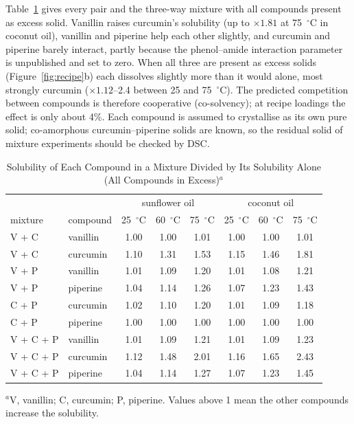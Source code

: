 \documentclass[journal=jceaax,manuscript=article,layout=twocolumn]{achemso}
\begin{document}
Table~\ref{tab:mix} gives every pair and the three-way mixture with all compounds present as excess solid. Vanillin raises curcumin's solubility (up to $\times1.81$ at 75~$^\circ$C in coconut oil), vanillin and piperine help each other slightly, and curcumin and piperine barely interact, partly because the phenol--amide interaction parameter is unpublished and set to zero. When all three are present as excess solids (Figure~\ref{fig:recipe}b) each dissolves slightly more than it would alone, most strongly curcumin ($\times1.12$--2.4 between 25 and 75~$^\circ$C). The predicted competition between compounds is therefore cooperative (co-solvency); at recipe loadings the effect is only about 4\%. Each compound is assumed to crystallise as its own pure solid; co-amorphous curcumin--piperine solids are known, so the residual solid of mixture experiments should be checked by DSC.

\begin{table}
\caption{Solubility of Each Compound in a Mixture Divided by Its Solubility Alone (All Compounds in Excess)$^a$}
\label{tab:mix}
\small
\begin{tabular}{llcccccc}
\toprule
 & & \multicolumn{3}{c}{sunflower oil} & \multicolumn{3}{c}{coconut oil}\\
mixture & compound & 25~$^\circ$C & 60~$^\circ$C & 75~$^\circ$C & 25~$^\circ$C & 60~$^\circ$C & 75~$^\circ$C\\
\midrule
V + C & vanillin & 1.00 & 1.00 & 1.01 & 1.00 & 1.00 & 1.01 \\
V + C & curcumin & 1.10 & 1.31 & 1.53 & 1.15 & 1.46 & 1.81 \\
V + P & vanillin & 1.01 & 1.09 & 1.20 & 1.01 & 1.08 & 1.21 \\
V + P & piperine & 1.04 & 1.14 & 1.26 & 1.07 & 1.23 & 1.43 \\
C + P & curcumin & 1.02 & 1.10 & 1.20 & 1.01 & 1.09 & 1.18 \\
C + P & piperine & 1.00 & 1.00 & 1.00 & 1.00 & 1.00 & 1.00 \\
V + C + P & vanillin & 1.01 & 1.09 & 1.21 & 1.01 & 1.09 & 1.23 \\
V + C + P & curcumin & 1.12 & 1.48 & 2.01 & 1.16 & 1.65 & 2.43 \\
V + C + P & piperine & 1.04 & 1.14 & 1.27 & 1.07 & 1.23 & 1.45 \\
\bottomrule
\end{tabular}

\footnotesize $^a$V, vanillin; C, curcumin; P, piperine. Values above 1 mean the other compounds increase the solubility.
\end{table}
\end{document}
